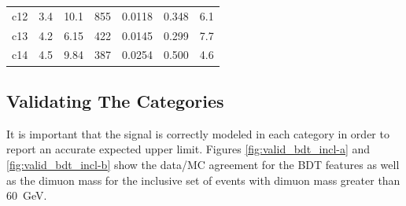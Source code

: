 \begin{table}[htb]
\begin{center}
\begin{tabular}{crrrrrr}
        c12        &         3.4     &        10.1     &        855      &        0.0118      &     0.348    &  6.1   \\
        c13        &         4.2     &        6.15     &        422      &        0.0145      &     0.299    &  7.7   \\
        c14        &         4.5     &        9.84     &        387      &        0.0254      &     0.500    &  4.6   \\
      \hline
    \end{tabular}
  \end{center}
\end{table}

\FloatBarrier
\subsection{Validating The Categories}

It is important that the signal is correctly modeled in each category in order to report an accurate expected upper limit.
Figures \ref{fig:valid_bdt_incl-a} and \ref{fig:valid_bdt_incl-b} show the data/MC agreement for the BDT features as well as the dimuon mass
for the inclusive set of events with dimuon mass greater than 60~GeV.

